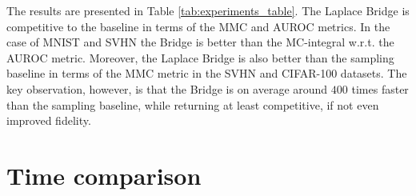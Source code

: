

The results are presented in Table \ref{tab:experiments_table}. The Laplace Bridge is competitive to the baseline in terms of the MMC and AUROC metrics. In the case of MNIST and SVHN the Bridge is better than the MC-integral w.r.t. the AUROC metric. Moreover, the Laplace Bridge is also better than the sampling baseline in terms of the MMC metric in the SVHN and CIFAR-100 datasets. The key observation, however, is that the Bridge is on average around $400$ times faster than the sampling baseline, while returning at least competitive, if not even improved fidelity.


\section{Time comparison}
\label{subsec:exp3_time}


